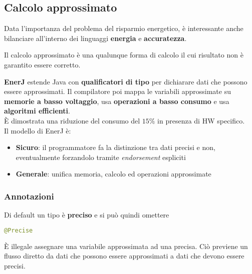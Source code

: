 \subsection{Calcolo approssimato}
Data l'importanza del problema del risparmio energetico, è interessante anche bilanciare all'interno dei linguaggi \textbf{energia} e \textbf{accuratezza}.

\begin{definition}
	Il calcolo 	approssimato è una qualunque forma di calcolo il cui risultato non è garantito essere corretto.
\end{definition}
\textbf{EnerJ} estende Java con \textbf{qualificatori di tipo} per dichiarare dati che possono essere approssimati. Il compilatore poi mappa le variabili approssimate su \textbf{memorie a basso voltaggio}, usa \textbf{operazioni a basso consumo} e usa \textbf{algoritmi efficienti}.\\
È dimostrata una riduzione del consumo del $15\%$ in presenza di HW specifico.\\
Il modello di EnerJ è:
\begin{itemize}
	\item \textbf{Sicuro}: il programmatore fa la distinzione tra dati precisi e non, eventualmente forzandolo tramite \textit{endorsement} espliciti
	\item \textbf{Generale}: unifica memoria, calcolo ed operazioni approssimate
\end{itemize}

\subsubsection{Annotazioni}
Di default un tipo è \textbf{preciso} e si può quindi omettere
\begin{lstlisting}[language=Java]
	@Precise
\end{lstlisting}
È illegale assegnare una variabile approssimata ad una precisa. Ciò previene un flusso diretto da dati che possono essere approssimati a dati che devono essere precisi.

